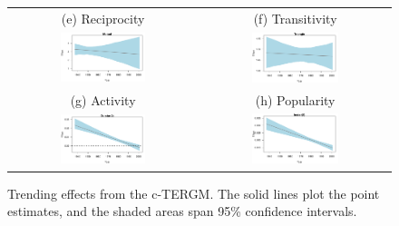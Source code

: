 \documentclass[headsepline=true, abstracton]{scrartcl}
\begin{document}
\begin{figure}[H]
\begin{tabular}{cc}
   (e) Reciprocity & (f) Transitivity \\
\includegraphics[width = 0.475\textwidth, trim= 0.1cm 1cm 0.5cm .45cm,clip=true]{images/mutual_coef_trend.pdf} & \includegraphics[width = 0.475\textwidth, trim= 0.1cm 1cm 0.5cm .45cm,clip=true]{images/triangle_coef_trend.pdf} \\
 
    (g) Activity & (h) Popularity \\
\includegraphics[width = 0.475\textwidth, trim= 0.1cm 1cm 0.5cm .45cm,clip=true]{images/o2star_coef_trend.pdf} & \includegraphics[width = 0.475\textwidth, trim= 0.1cm 1cm 0.5cm .45cm,clip=true]{images/i2star_coef_trend.pdf} \\
 
 
\end{tabular}
\caption{Trending effects from the c-TERGM. The solid lines plot the point estimates, and the shaded areas span 95\% confidence intervals. }
 \label{fig:coeftrends}
\vspace{-.25cm}
\end{figure} 
\end{document}
